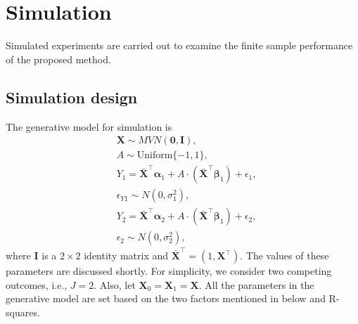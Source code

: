 \documentclass[12pt]{article}
\newcommand{\itl}{\intercal}
\newcommand{\bs}{ \boldsymbol}
\begin{document}
\section{Simulation}
%

Simulated experiments are carried out to examine the finite sample performance of the proposed method. 
\subsection{Simulation design}
The generative model for simulation is 
\begin{equation*}
\begin{aligned}
& \bs{X} \sim MVN(\bs{0}, \bs{I}),\\
& A \sim \text{Uniform}\{ -1, 1\}, \\
& Y_1 =  \bar{\bs{X}}^{\itl}\bs{\alpha}_{1} + A \cdot (\bar{\bs{X}}^{\itl}\bs{\beta}_{1}) + \epsilon_{1}, \\
& \epsilon_{Y1} \sim N(0, \sigma^{2}_{1}), \\
& Y_2 = \bar{\bs{X}}^{\itl}\bs{\alpha}_{2} + A\cdot(\bar{\bs{X}}^{\itl}\bs{\beta}_{1}) + \epsilon_{2}, \\
& \epsilon_2 \sim N(0, \sigma^{2}_2),
\end{aligned}
\end{equation*}
where $\bs{I}$ is a $2\times2$ identity matrix and $\bar{\bs{X}}^{\itl} = (1, \bs{X}^{\itl})$. The values of these parameters are discussed shortly. For simplicity, we consider two competing outcomes, i.e., $J=2$. Also, let $\bs{X}_0 = \bs{X}_1 = \bs{X}$. 
All the parameters in the generative model are set based on the two factors mentioned in below and R-squares.\\
\end{document}
